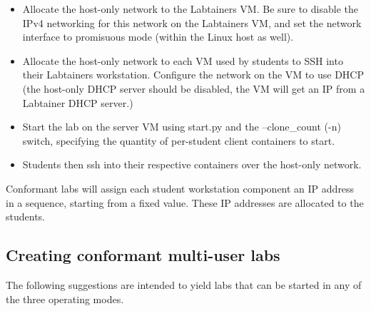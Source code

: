 \documentclass[12pt]{article}
\begin{document}
\begin{itemize}
\item Allocate the host-only network to the Labtainers VM. Be sure
to disable the IPv4 networking for this network on the Labtainers VM, and
set the network interface to promisuous mode (within the Linux host as well).
\item Allocate the host-only network to each VM used by students to SSH into their
Labtainers workstation.  Configure the network on the VM to use DHCP (the host-only
DHCP server should be disabled, the VM will get an IP from a Labtainer DHCP server.)

\item Start the lab on the server VM using start.py and the --clone\_count (-n) switch,
specifying the quantity of per-student client containers to start.

\item Students then ssh into their respective containers over the host-only network.
\end{itemize}

Conformant labs will assign each student workstation component an IP address in a sequence,
starting from a fixed value.  These IP addresses are allocated to the students.

\subsection{Creating conformant multi-user labs}
\label{conformant multi-user}
The following suggestions are intended to yield labs that can be started in any of
the three operating modes.
\end{document}
